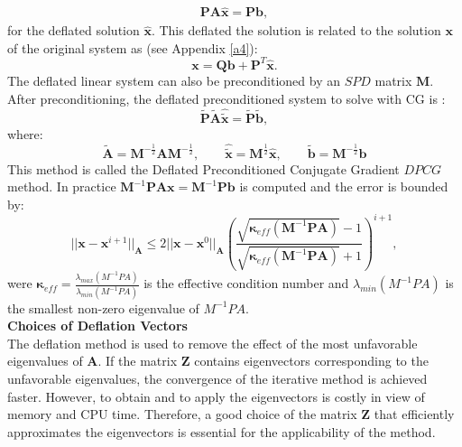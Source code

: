 \documentclass[12pt]{article}
\begin{document}
\begin{align}\label{eq:defsol}
\mathbf{P}\mathbf{A} \hat{\mathbf{x}}=\mathbf{P}\mathbf{b},
\end{align}
for the deflated solution $\hat{\mathbf{x}}$. 
This deflated the solution is related to the solution $\mathbf{x}$ of the original system as (see Appendix \ref{a4}):
\begin{equation}\label{eq:xfromxh}
    \mathbf{x}=\mathbf{Q}\mathbf{b}+\mathbf{P}^T\mathbf{\hat{x}}.
\end{equation}
The deflated linear system can also be preconditioned by an $SPD$ matrix $\mathbf{M}$. After preconditioning, the deflated preconditioned system to solve with CG is \cite{Tang09}:
$$\tilde{\mathbf{P}} \tilde{\mathbf{A}} \hat{\tilde{\mathbf{x}}}=\tilde{\mathbf{P}}\tilde{\mathbf{b}},$$
where:
\begin{equation*}
 \tilde{\mathbf{A}}=\mathbf{M}^{-\frac{1}{2}}\mathbf{A}\mathbf{M}^{-\frac{1}{2}}, \qquad \hat{\tilde{\mathbf{x}}}=\mathbf{M}^{\frac{1}{2}}\hat{\mathbf{x}}, \qquad
 \tilde{\mathbf{b}}=\mathbf{M}^{-\frac{1}{2}}\mathbf{b}
\end{equation*}
This method is called the Deflated Preconditioned Conjugate Gradient $DPCG$ method.
In practice $\mathbf{M}^{-1}\mathbf{P}\mathbf{A}\mathbf{x}=\mathbf{M}^{-1}\mathbf{P}\mathbf{b}$ is computed and the error is bounded by:
\begin{equation*}
 ||\mathbf{x}-\mathbf{x}^{i+1}||_\mathbf{A}\leq 2||\mathbf{x}-\mathbf{x}^{0}||_\mathbf{A} \left( \frac{\sqrt{\mathbf{\kappa}_{eff}(\mathbf{M}^{-1}\mathbf{P}\mathbf{A})}-1}{\sqrt{\mathbf{\kappa}_{eff}(\mathbf{M}^{-1}\mathbf{P}\mathbf{A})}+1} \right)^{i+1},
\end{equation*}
were $\mathbf{\kappa}_{eff}=\frac{\lambda_{max}(M^{-1}PA)}{\lambda_{min}(M^{-1}PA)}$ is the effective condition 
number and $\lambda_{min}(M^{-1}PA)$ is the smallest non-zero eigenvalue of $M^{-1}PA$.\\
\textbf{Choices of Deflation Vectors}\\
The deflation method is used to remove the effect of the most unfavorable eigenvalues
of $\mathbf{A}$. If the matrix $\mathbf{Z}$ contains eigenvectors corresponding to the unfavorable eigenvalues, the convergence of the iterative method is achieved faster. However, to obtain and to apply the eigenvectors is costly in view of memory and CPU time.
Therefore, a good choice of the matrix $\mathbf{Z}$ that efficiently approximates the eigenvectors is essential
for the applicability of the method.\\
\end{document}
